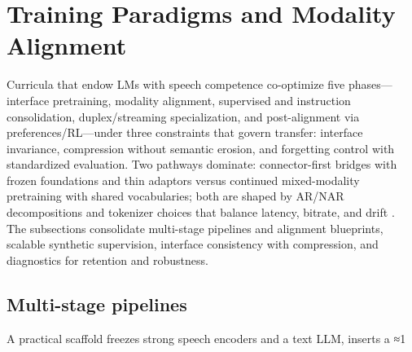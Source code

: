 \section{Training Paradigms and Modality Alignment} \label{sec:Training Paradigms and Modality Alignment}
Curricula that endow LMs with speech competence co-optimize five phases—interface pretraining, modality alignment, supervised and instruction consolidation, duplex/streaming specialization, and post-alignment via preferences/RL—under three constraints that govern transfer: interface invariance, compression without semantic erosion, and forgetting control with standardized evaluation. Two pathways dominate: connector-first bridges with frozen foundations and thin adaptors versus continued mixed-modality pretraining with shared vocabularies; both are shaped by AR/NAR decompositions and tokenizer choices that balance latency, bitrate, and drift \cite{turetzky2024lastlanguagemodelawarespeechtokenization,wang2023slmbridgethingapbetweenspeechtextfoundat,zeng2024scalingspeechtextpretrainingsyntheticint}. The subsections consolidate multi-stage pipelines and alignment blueprints, scalable synthetic supervision, interface consistency with compression, and diagnostics for retention and robustness.

\subsection{Multi-stage pipelines} \label{subsec:Multi-stage pipelines}
A practical scaffold freezes strong speech encoders and a text LLM, inserts a ≈1%

